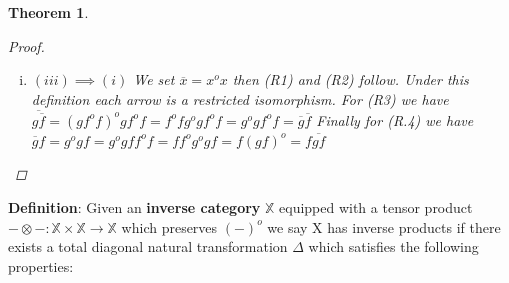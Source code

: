 \documentclass[11pt, oneside]{amsart}
\newtheorem{theorem}{Theorem}
\theoremstyle{definition}
\theoremstyle{definition}
\begin{document}
\begin{theorem}
\begin{proof}
\begin{enumerate}[(i)]
 For functoriality we have $gff^{o}g^{o}gf=gg^{o}gff^{o}f=gf$ and $f^{o}ff^{o}g^{o}gg^{o}=f^{o}g^{o}$ and similarly $1^{o}=1$
 \item $(iii) \implies (i)$ We set $\overline{x}=x^{o}x$ then (R1) and (R2) follow. Under this definition each arrow is a restricted isomorphism. For (R3) we have \\
 $\overline{g\overline{f}}=(gf^{o}f)^{o}gf^{o}f=f^{o}fg^{o}gf^{o}f=g^{o}gf^{o}f=\overline{g}\overline{f}$
 Finally for (R.4) we have 
 $\overline{g}f=g^{o}gf=g^{o}gff^{o}f=ff^{o}g^{o}gf=f(gf)^{o}=f\overline{gf}$
 \end{enumerate}

\end{proof}
\end{theorem}
\textbf{Definition}: Given an \textbf{inverse category} $\mathbb{X}$ equipped with a tensor product ${-}\otimes{-}: \mathbb{X} \times \mathbb{X} \to \mathbb{X}$ which preserves $(-)^{o}$ we say X has inverse products if there exists a total diagonal natural transformation $\Delta$ which satisfies the following properties:
\end{document}
